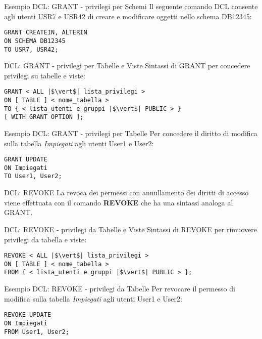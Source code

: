 %
\begin{frame}[fragile]{Esempio DCL: GRANT - privilegi per Schemi}
Il seguente comando DCL consente agli utenti USR7 e USR42 di creare e modificare oggetti nello schema DB12345:
\begin{lstlisting}
GRANT CREATEIN, ALTERIN
ON SCHEMA DB12345
TO USR7, USR42;
\end{lstlisting}
\end{frame}
%
\begin{frame}[fragile]{DCL: GRANT - privilegi per Tabelle e Viste}
Sintassi di GRANT per concedere privilegi su tabelle e viste:
\begin{lstlisting}
GRANT < ALL |$\vert$| lista_privilegi >
ON [ TABLE ] < nome_tabella >
TO { < lista_utenti e gruppi |$\vert$| PUBLIC > }
[ WITH GRANT OPTION ];
\end{lstlisting}
\end{frame}
%
\begin{frame}[fragile]{Esempio DCL: GRANT - privilegi per Tabelle}
Per concedere il diritto di modifica sulla tabella \textit{Impiegati} agli utenti User1 e User2:
\begin{lstlisting}
GRANT UPDATE
ON Impiegati
TO User1, User2;
\end{lstlisting}
\end{frame}
%
\begin{frame}[fragile]{DCL: REVOKE}
La revoca dei permessi con annullamento dei diritti di accesso viene effettuata con il comando \textbf{REVOKE} che ha una sintassi analoga al GRANT.
\end{frame}
\begin{frame}[fragile]{DCL: REVOKE - privilegi da Tabelle e Viste}
Sintassi di REVOKE per rimuovere privilegi da tabella e viste:
\begin{lstlisting}
REVOKE < ALL |$\vert$| lista_privilegi >
ON [ TABLE ] < nome_tabella >
FROM { < lista_utenti e gruppi |$\vert$| PUBLIC > };
\end{lstlisting}
\end{frame}
%
\begin{frame}[fragile]{Esempio DCL: REVOKE - privilegi da Tabelle}
Per revocare il permesso di modifica sulla tabella \textit{Impiegati} agli utenti User1 e User2:
\begin{lstlisting}
REVOKE UPDATE
ON Impiegati
FROM User1, User2;
\end{lstlisting}
\end{frame}
%
